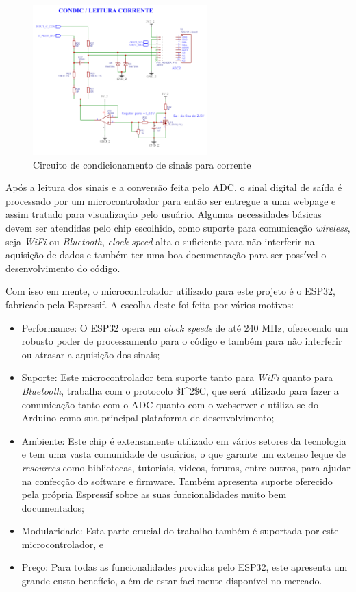 \begin{figure}[htb!]
    \caption{Circuito de condicionamento de sinais para corrente}
    \label{fig:circ-cond-c}
    \includegraphics[width=0.6\textwidth]{figuras/circ-cond-c.png}
    \fonte{}
\end{figure}

Após a leitura dos sinais e a conversão feita pelo ADC, o sinal digital de saída é processado por um microcontrolador para então ser entregue a uma webpage e assim tratado para visualização pelo usuário. Algumas necessidades básicas devem ser atendidas pelo chip escolhido, como suporte para comunicação \textit{wireless}, seja \textit{WiFi} ou \textit{Bluetooth}, \textit{clock speed} alta o suficiente para não interferir na aquisição de dados e também ter uma boa documentação para ser possível o desenvolvimento do código.

Com isso em mente, o microcontrolador utilizado para este projeto é o ESP32, fabricado pela Espressif. A escolha deste foi feita por vários motivos:

\begin{itemize}
    \item Performance: O ESP32 opera em \textit{clock speeds} de até 240 MHz, oferecendo um robusto poder de processamento para o código e também para não interferir ou atrasar a aquisição dos sinais;
    \item Suporte: Este microcontrolador tem suporte tanto para \textit{WiFi} quanto para \textit{Bluetooth}, trabalha com o protocolo \gls{$I^2$C}, que será utilizado para fazer a comunicação tanto com o \gls{ADC} quanto com o webserver e utiliza-se do Arduino como sua principal plataforma de desenvolvimento;
    \item Ambiente: Este chip é extensamente utilizado em vários setores da tecnologia e tem uma vasta comunidade de usuários, o que garante um extenso leque de \textit{resources} como bibliotecas, tutoriais, videos, forums, entre outros, para ajudar na confecção do software e firmware. Também apresenta suporte oferecido pela própria Espressif sobre as suas funcionalidades muito bem documentados;
    \item Modularidade: Esta parte crucial do trabalho também é suportada por este microcontrolador, e
    \item Preço: Para todas as funcionalidades providas pelo ESP32, este apresenta um grande custo benefício, além de estar facilmente disponível no mercado.
\end{itemize}

